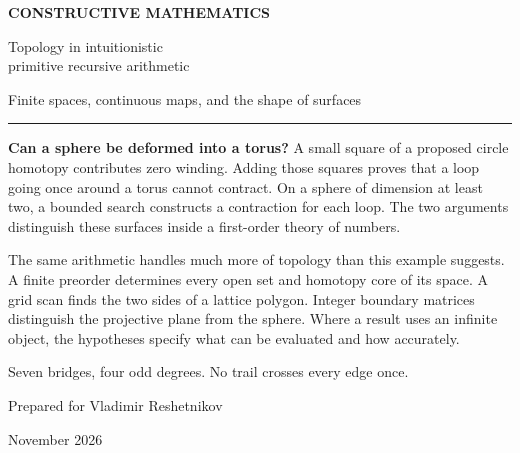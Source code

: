 \documentclass[11pt,letterpaper]{article}
\theoremstyle{proved}
\theoremstyle{definition}
\begin{document}
\hypersetup{pageanchor=false}
\begin{titlepage}
\vspace*{.32in}
{\sffamily\bfseries\color{accent}\large CONSTRUCTIVE MATHEMATICS\par}
\vspace{.25in}
{\sffamily\bfseries\color{ink}\raggedright\fontsize{34}{39}\selectfont Topology in intuitionistic\\primitive recursive arithmetic\par}
\vspace{.22in}
{\Large Finite spaces, continuous maps, and the shape of surfaces\par}
\vspace{.40in}
{\noindent\rule{\linewidth}{.6pt}\par}
\vspace{.13in}
\noindent\textbf{Can a sphere be deformed into a torus?}
A small square of a proposed circle homotopy contributes zero winding. Adding those squares proves that a loop going once around a torus cannot contract. On a sphere of dimension at least two, a bounded search constructs a contraction for each loop. The two arguments distinguish these surfaces inside a first-order theory of numbers.

\medskip\noindent
The same arithmetic handles much more of topology than this example suggests. A finite preorder determines every open set and homotopy core of its space. A grid scan finds the two sides of a lattice polygon. Integer boundary matrices distinguish the projective plane from the sphere. Where a result uses an infinite object, the hypotheses specify what can be evaluated and how accurately.

\vspace{.25in}
\begin{center}
\par
{\small Seven bridges, four odd degrees. No trail crosses every edge once.}
\end{center}
\vfill
{\sffamily\color{ink}Prepared for Vladimir Reshetnikov\par}
{ November 2026\par}
\end{titlepage}
\end{document}

